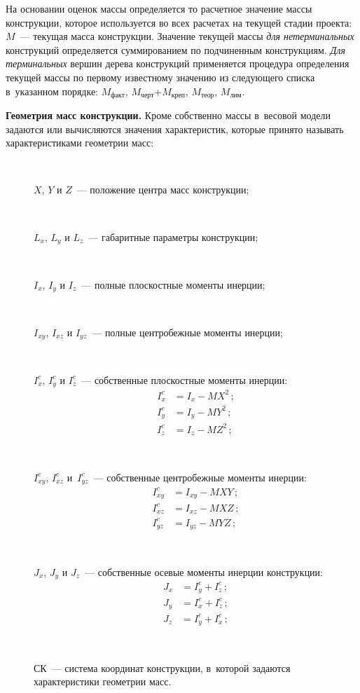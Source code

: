 \begin{multicols}{2}
  На основании оценок массы определяется то расчетное значение массы 
конструкции, которое используется во всех расчетах на текущей стадии 
проекта: 
  $M$~--- текущая масса конструкции. Значение текущей массы \textit{для 
нетерминальных} конструкций определяется суммированием по подчиненным 
конструкциям. \textit{Для терминальных} вершин дерева конструкций 
применяется процедура определения текущей массы по первому известному 
значению из следующего списка в~указанном порядке: $M_{\mathrm{факт}}$, 
$M_{\mathrm{черт}}$\;+\;$M_{\mathrm{креп}}$, $M_{\mathrm{теор}}$, $M_{\mathrm{лим}}$.
  
  \textbf{Геометрия масс конструкции.} Кроме собственно массы в~весовой 
модели задаются или вычисляются значения характеристик, которые принято 
называть характеристиками геометрии масс: 
  \begin{description}
  \item[\,] $X$, $Y$ и $Z$~--- положение центра масс конструкции; 
  \item[\,] $L_x$, $L_y$ и $L_z$~--- габаритные параметры конструкции;
  \item[\,] $I_x$, $I_y$ и $I_z$~--- полные плоскостные моменты инерции;
  \item[\,]  $I_{xy}$, $I_{xz}$ и $I_{yz}$~--- полные центробежные моменты 
инерции;
  \item[\,] $I^c_x$, $I^c_y$ и  $I^c_z$~--- собственные плоскостные моменты 
инерции:
  \begin{align*}
  I^c_x &= I_x - M X^2\,;\\ 
  I^c_y &= I_y - M Y^2\,;\\ 
  I^c_z &= I_z - M Z^2\,;
 \end{align*}
  \item[\,] $I^c_{xy}$, $I^c_{xz}$ и~$I^c_{yz}$~--- собственные центробежные 
моменты инерции:
 \begin{align*}
  I^c_{xy} &= I_{xy}- M X Y\,;\\
   I^c_{xz} &= I_{xz}- M X Z\,;\\
   I^c_{yz} &= I_{yz}- M Y Z\,;
\end{align*}
  \item[\,] $J_x$, $J_y$ и $J_z$~--- собственные осевые моменты инерции 
конструкции:
  \begin{align*}
  J_x &= I^c_y + I^c_z\,;\\ 
  J_y &= I^c_x + I^c_z\,;\\
   J_z &= I^c_y + I^c_x\,;
  \end{align*}
  \item[\,] СК~--- система координат конструкции, в~которой задаются 
характеристики геометрии масс.
  \end{description}
  

\end{multicols}
